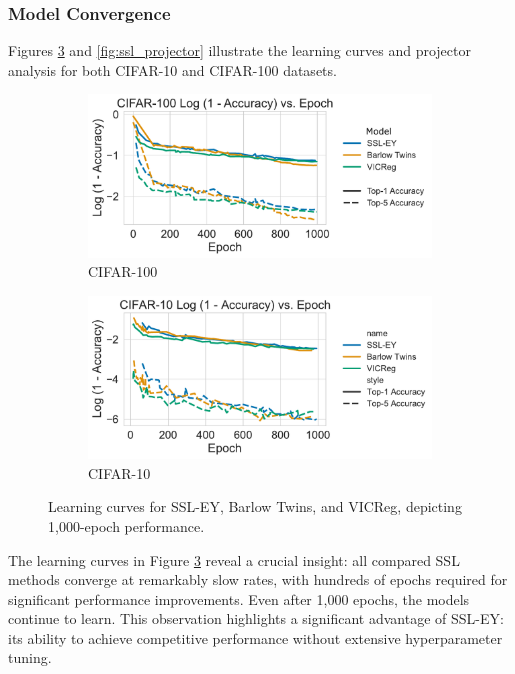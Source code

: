 \subsubsection{Model Convergence}
Figures \ref{fig:ssl_learning_curve} and \ref{fig:ssl_projector} illustrate the learning curves and projector analysis for both CIFAR-10 and CIFAR-100 datasets.

\begin{figure}[H]
    \begin{subfigure}[b]{0.48\textwidth}
        \centering
        \includegraphics[width=\textwidth]{figures/SSL/cifar100_learning_curve_log_error}
        \caption{CIFAR-100}
        \label{fig:ssl_learning_curve_cifar100}
    \end{subfigure}
    \hfill
    \begin{subfigure}[b]{0.48\textwidth}
        \centering
        \includegraphics[width=\textwidth]{figures/SSL/cifar10_learning_curve_log_error}
        \caption{CIFAR-10}
        \label{fig:ssl_learning_curve_cifar10}
    \end{subfigure}
    \caption{Learning curves for SSL-EY, Barlow Twins, and VICReg, depicting 1,000-epoch performance.}
    \label{fig:ssl_learning_curve}
\end{figure}

The learning curves in Figure \ref{fig:ssl_learning_curve} reveal a crucial insight: all compared SSL methods converge at remarkably slow rates, with hundreds of epochs required for significant performance improvements. Even after 1,000 epochs, the models continue to learn. This observation highlights a significant advantage of SSL-EY: its ability to achieve competitive performance without extensive hyperparameter tuning.

